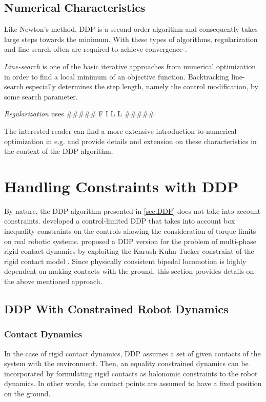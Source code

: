 \subsection{Numerical Characteristics}
Like Newton's method, \gls{DDP} is a second-order algorithm \citep{liao1992advantages} and consequently takes large steps towards the minimum. With these types of algorithms, regularization and line-search often are required to achieve convergence \cite{liao1991convergence}. 

\textit{Line-search} is one of the basic iterative approaches from numerical optimization in order to find a local minimum of an objective function. Backtracking line-search especially determines the step length, namely the control modification, by some search parameter.

\textit{Regularization} uses \#\#\#\#\# F I L L \#\#\#\#\#

The interested reader can find a more extensive introduction to numerical optimization in e.g. \cite{nocedal2006numerical} and \citeauthor{tassa2012synthesis}  
provide details and extension on these characteristics in the context of the \gls{DDP} algorithm.


\section{Handling Constraints with DDP}\label{sec:ConstrainedDDP}
By nature, the \gls{DDP} algorithm presented in \cref{sec:DDP} does not take into account constraints. \citeauthor{tassa2014control} developed a control-limited \gls{DDP} \cite{tassa2014control} that takes into account box inequality constraints on the controls allowing the consideration of torque limits on real robotic systems. \citeauthor{budhiraja2018differential} proposed a \gls{DDP} version for the problem of multi-phase rigid contact dynamics by exploiting the Karush-Kuhn-Tucker constraint of the rigid contact model \cite{budhiraja2018differential}. Since physically consistent bipedal locomotion is highly dependent on making contacts with the ground, this section provides details on the above mentioned approach.  

\subsection{DDP With Constrained Robot Dynamics}
\subsubsection{Contact Dynamics}
In the case of rigid contact dynamics, \gls{DDP} assumes a set of given contacts of the system with the environment. Then, an equality constrained dynamics can be incorporated by formulating rigid contacts as holonomic constraints to the robot dynamics. In other words, the contact points are assumed to have a fixed position on the ground. 

